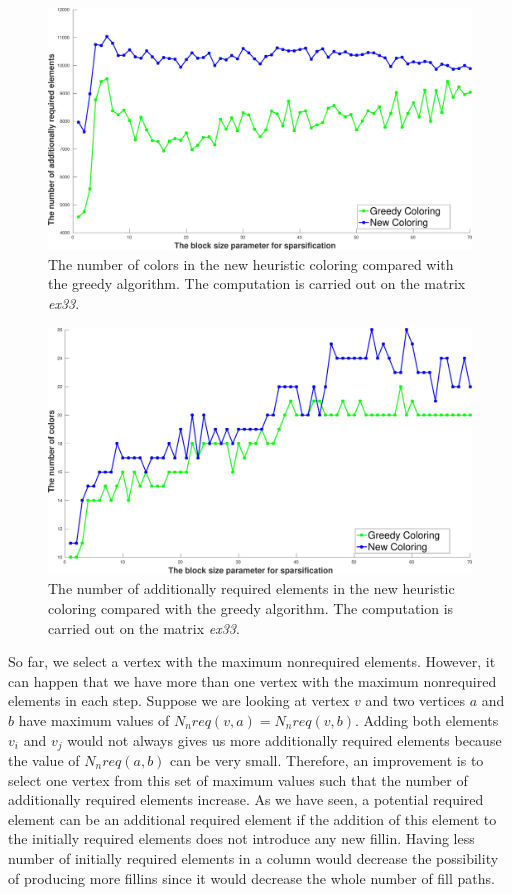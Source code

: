 \documentclass[12pt, oneside]{book}
\newcommand{\todo}[1]{\textbf{#1}}
\begin{document}
\begin{figure}
\centering
\includegraphics[width=0.9\linewidth]{bls_adds_ex33_without_alpha}
\caption{The number of colors in the new heuristic coloring compared with the greedy algorithm.
The computation is carried out on the matrix \textit{ex33}. }
\label{bls_adds_ex33_without_alpha}
\end{figure}

\begin{figure}
\centering
\includegraphics[width=0.9\linewidth]{bls_cols_ex33_without_alpha}
\caption{The number of additionally required elements in the new heuristic coloring compared with the greedy algorithm.
The computation is carried out on the matrix \textit{ex33}. }
\label{bls_cols_ex33_without_alpha}
\end{figure}

So far, we select a vertex with the maximum nonrequired elements. However, it can happen
that we have more than one vertex with the maximum nonrequired elements in each step.
Suppose we are looking at vertex $v$ and two vertices $a$ and $b$ have maximum values of 
$N_nreq(v,a) = N_nreq(v,b)$.
Adding both elements $v_i$ and $v_j$ would not always gives us more additionally required elements 
because the value of $N_nreq(a,b)$ can be very small. 
Therefore, an improvement is to select one vertex from this set of maximum values such that the number of
additionally required elements increase. As we have seen, a potential required element can be 
an additional required element if the addition of this element to the initially required elements
does not introduce any new fillin. Having less number of initially required elements in a column would decrease
the possibility of producing more fillins since it would decrease the whole number of fill paths. \todo{}
\end{document}
